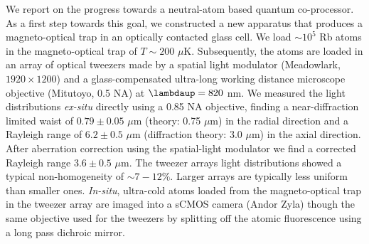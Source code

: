 \noindent We report on the progress towards a neutral-atom based quantum co-processor.
As a first step towards this goal, we constructed a new apparatus that produces a magneto-optical trap in an optically contacted glass cell. 
We load $\sim 10^5$ Rb atoms in the magneto-optical trap of $T\sim200$ $\mu$K.
Subsequently, the atoms are loaded in an array of optical tweezers made by a spatial light modulator (Meadowlark, $1920 \times 1200$) and a glass-compensated ultra-long working distance microscope objective (Mitutoyo, 0.5 NA) at $\lambdaup = 820$ nm.
We measured the light distributions \textit{ex-situ} directly using a 0.85 NA objective, finding a near-diffraction limited waist of $0.79\pm0.05$ $\mu$m (theory: 0.75 $\mu$m) in the radial direction and a Rayleigh range of $6.2 \pm 0.5$ $\mu$m (diffraction theory: 3.0 $\mu$m) in the axial direction.
After aberration correction using the spatial-light modulator we find a corrected Rayleigh range $3.6\pm0.5$ $\mu$m.
The tweezer arrays light distributions showed a typical non-homogeneity of $\sim 7-12\%$.
Larger arrays are typically less uniform than smaller ones. 
\textit{In-situ}, ultra-cold atoms loaded from the magneto-optical trap in the tweezer array are imaged into a sCMOS camera (Andor Zyla) though the same objective used for the tweezers by splitting off the atomic fluorescence using a long pass dichroic mirror.
